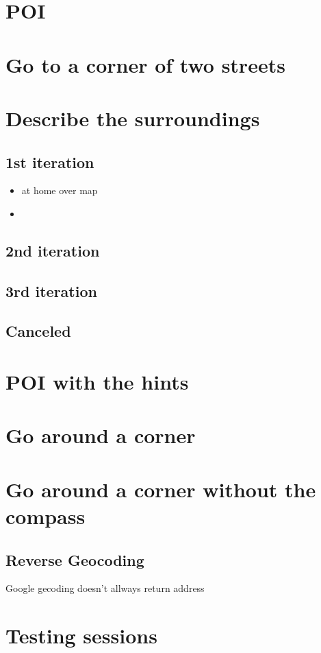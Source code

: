 \documentclass[11pt,oneside,a4paper]{book}
\begin{document}
		\section{POI}		
		\section{Go to a corner of two streets}		
		\section{Describe the surroundings}
			\subsection{1st iteration}
				\begin{itemize}
					\item at home over map
					\item 
				\end{itemize}
			\subsection{2nd iteration}			
			\subsection{3rd iteration}	
		\subsection{Canceled}		
		\section{POI with the hints}
		\section{Go around a corner}
		\section{Go around a corner without the compass}				
		\subsection{Reverse Geocoding}
			Google gecoding doesn't allways return address
		
		
						
		
		\section{Testing sessions}
\end{document}
